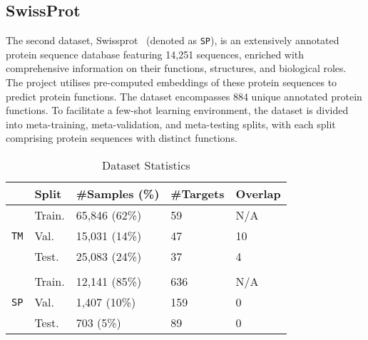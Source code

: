 
\subsection{SwissProt}

The second dataset, Swissprot~\cite{uniprot2019} (denoted as \texttt{SP}), is an extensively annotated protein sequence database featuring 14,251 sequences, enriched with comprehensive information on their functions, structures, and biological roles. The project utilises pre-computed embeddings of these protein sequences to predict protein functions. The dataset encompasses 884 unique annotated protein functions. To facilitate a few-shot learning environment, the dataset is divided into meta-training, meta-validation, and meta-testing splits, with each split comprising protein sequences with distinct functions.



\begin{table}[h]
    \centering
    \caption{Dataset Statistics}
    \label{tab:data}
    \begin{tabular}{lllll}
        \toprule
        & \textbf{Split} & \textbf{\#Samples} (\%) & \textbf{\#Targets} & \textbf{Overlap} \\
        \midrule
        \multirow{3}{*}{\texttt{TM}} 
        & Train. & 65,846 (62\%) & 59 & N/A \\
        & Val. & 15,031 (14\%) & 47 & 10 \\
        & Test. & 25,083 (24\%) & 37 & 4 \\
        \\
        \multirow{3}{*}{\texttt{SP}} 
        & Train. & 12,141 (85\%) & 636 & N/A \\
        & Val. & 1,407 (10\%) & 159 & 0 \\
        & Test. & 703 (5\%) & 89 & 0 \\
        \bottomrule
    \end{tabular}
\end{table}
